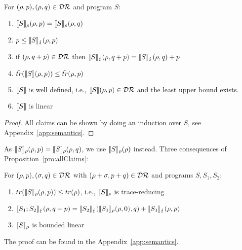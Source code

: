 \documentclass[a4paper,UKenglish,cleveref, autoref, thm-restate]{lipics-v2021}
\begin{document}
\begin{proposition}
    \label{pro:allClaims}
    For $(\rho,p), (\rho,q )\in \mathcal{D}\mathcal{R}$ and program $S$:
    \begin{enumerate}
        \item $\llbracket S \rrbracket_{\rho}(\rho,p) = \llbracket S \rrbracket_{\rho}(\rho,q)$
        \item $p \leq\llbracket S \rrbracket_{\lightning}(\rho,p)$
        \item if $(\rho,q+p)\in \mathcal{D}\mathcal{R}$ then $\llbracket S \rrbracket_{\lightning}(\rho,q+p) = \llbracket S \rrbracket_{\lightning}(\rho,q) + p$
        \item $\tilde{tr}(\llbracket S \rrbracket(\rho,p))\leq \tilde{tr}(\rho,p)$
        \item $\llbracket S \rrbracket$ is well defined, i.e., $\llbracket S \rrbracket(\rho,p) \in \mathcal{D}\mathcal{R}$ and the least upper bound exists.
        \item $\llbracket S \rrbracket$ is linear
    \end{enumerate}
\end{proposition}
\begin{proof}
    All claims can be shown by doing an induction over $S$, see Appendix~\ref{app:semantics}.
\end{proof}
As $\llbracket S \rrbracket_{\rho}(\rho,p) = \llbracket S \rrbracket_{\rho}(\rho,q)$, we use $\llbracket S \rrbracket_{\rho}(\rho)$ instead.
Three consequences of Proposition~\ref{pro:allClaims}:
\begin{lemma}
    \label{lem:bounded}
 For $(\rho,p), (\sigma,q) \in \mathcal{D}\mathcal{R}$ with $(\rho+\sigma,p+q) \in \mathcal{D}\mathcal{R}$ and programs $S, S_1, S_2$:
 \begin{enumerate}
    \item $tr(\llbracket S \rrbracket_{\rho}(\rho,p))\leq tr(\rho)$, i.e., $\llbracket S \rrbracket_{\rho}$ is trace-reducing
    \item $\llbracket S_1;S_2 \rrbracket_{\lightning} (\rho,q+p) =
        \llbracket S_2 \rrbracket_{\lightning}(\llbracket S_1 \rrbracket_{\rho}(\rho,0),q) + \llbracket S_1 \rrbracket_{\lightning}(\rho,p)$
    \item $\llbracket S \rrbracket_{\rho}$ is bounded linear
 \end{enumerate}
\end{lemma}
The proof can be found in the Appendix~\ref{app:semantics}.
\end{document}
